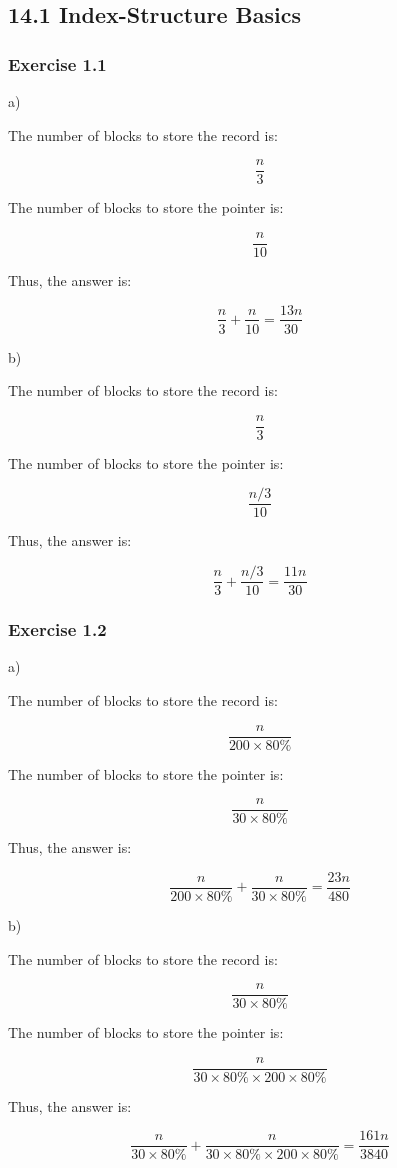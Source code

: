\documentclass[../../main.tex]{subfiles}
\begin{document}
\subsection{14.1 Index-Structure Basics}

\subsubsection*{Exercise 1.1}

a)

The number of blocks to store the record is:

$$
\frac{n}{3}
$$

The number of blocks to store the pointer is:

$$
\frac{n}{10}
$$

Thus, the answer is:

$$
\frac{n}{3} + \frac{n}{10} = \frac{13n}{30}
$$

b)

The number of blocks to store the record is:

$$
\frac{n}{3}
$$

The number of blocks to store the pointer is:

$$
\frac{n / 3}{10}
$$

Thus, the answer is:

$$
\frac{n}{3} + \frac{n / 3}{10} = \frac{11n}{30}
$$

\subsubsection*{Exercise 1.2}

a)

The number of blocks to store the record is:

$$
\frac{n}{200 \times 80\%}
$$

The number of blocks to store the pointer is:

$$
\frac{n}{30 \times 80\%}
$$

Thus, the answer is:

$$
\frac{n}{200 \times 80\%} + \frac{n}{30 \times 80\%} = \frac{23n}{480}
$$

b)

The number of blocks to store the record is:

$$
\frac{n}{30 \times 80\%}
$$

The number of blocks to store the pointer is:

$$
\frac{n}{30 \times 80\% \times 200 \times 80\%}
$$

Thus, the answer is:

$$
\frac{n}{30 \times 80\%} + \frac{n}{30 \times 80\% \times 200 \times 80\%} = \frac{161n}{3840}
$$
\end{document}
